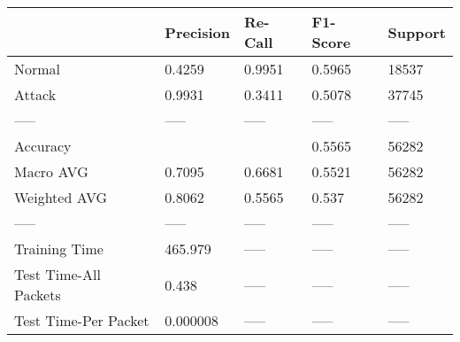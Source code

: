 \begin{tabular}{lllll}
\toprule
{} & Precision & Re-Call & F1-Score & Support \\
\midrule
Normal                &    0.4259 &  0.9951 &   0.5965 &   18537 \\
Attack                &    0.9931 &  0.3411 &   0.5078 &   37745 \\
-----                 &     ----- &   ----- &    ----- &   ----- \\
Accuracy              &           &         &   0.5565 &   56282 \\
Macro AVG             &    0.7095 &  0.6681 &   0.5521 &   56282 \\
Weighted AVG          &    0.8062 &  0.5565 &    0.537 &   56282 \\
-----                 &     ----- &   ----- &    ----- &   ----- \\
Training Time         &   465.979 &   ----- &    ----- &   ----- \\
Test Time-All Packets &     0.438 &   ----- &    ----- &   ----- \\
Test Time-Per Packet  &  0.000008 &   ----- &    ----- &   ----- \\
\bottomrule
\end{tabular}
